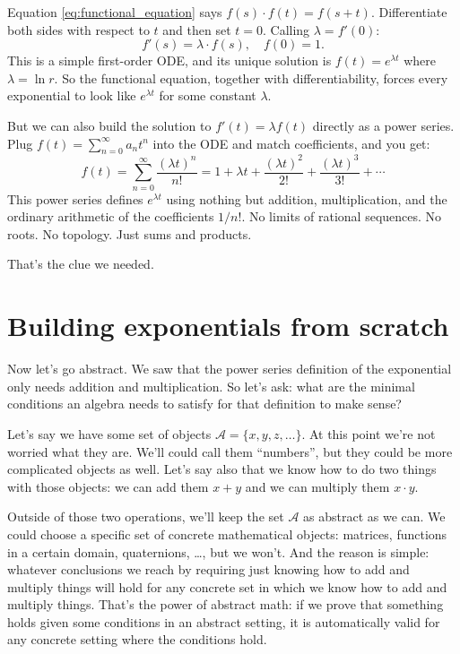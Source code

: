 Equation \eqref{eq:functional_equation} says $f(s) \cdot f(t) = f(s+t)$. Differentiate both sides with respect to $t$ and then set $t = 0$. Calling $\lambda = f'(0)$:
\begin{equation}
    f'(s) = \lambda \cdot f(s), \quad f(0) = 1.
\end{equation}
This is a simple first-order ODE, and its unique solution is $f(t) = e^{\lambda t}$ where $\lambda = \ln r$. So the functional equation, together with differentiability, forces every exponential to look like $e^{\lambda t}$ for some constant $\lambda$.

But we can also build the solution to $f'(t) = \lambda f(t)$ directly as a power series. Plug $f(t) = \sum_{n=0}^{\infty} a_n t^n$ into the ODE and match coefficients, and you get:
\begin{equation}
    \label{eq:real_exp_series}
    f(t) = \sum_{n=0}^{\infty} \frac{(\lambda t)^n}{n!} = 1 + \lambda t + \frac{(\lambda t)^2}{2!} + \frac{(\lambda t)^3}{3!} + \cdots
\end{equation}
This power series defines $e^{\lambda t}$ using nothing but addition, multiplication, and the ordinary arithmetic of the coefficients $1/n!$. No limits of rational sequences. No roots. No topology. Just sums and products.

That's the clue we needed.

\section{Building exponentials from scratch}

Now let's go abstract. We saw that the power series definition of the exponential only needs addition and multiplication. So let's ask: what are the minimal conditions an algebra needs to satisfy for that definition to make sense?

Let's say we have some set of objects $\mathcal{A} = \{x, y, z, \ldots\}$. At this point we're not worried what they are. We'll could call them ``numbers'', but they could be more complicated objects as well. Let's say also that we know how to do two things with those objects: we can add them $x + y$ and we can multiply them $x \cdot y$.

Outside of those two operations, we'll keep the set $\mathcal{A}$ as abstract as we can. We could choose a specific set of concrete mathematical objects: matrices, functions in a certain domain, quaternions, \ldots, but we won't. And the reason is simple: whatever conclusions we reach by requiring just knowing how to add and multiply things will hold for any concrete set in which we know how to add and multiply things. That's the power of abstract math: if we prove that something holds given some conditions in an abstract setting, it is automatically valid for any concrete setting where the conditions hold.

